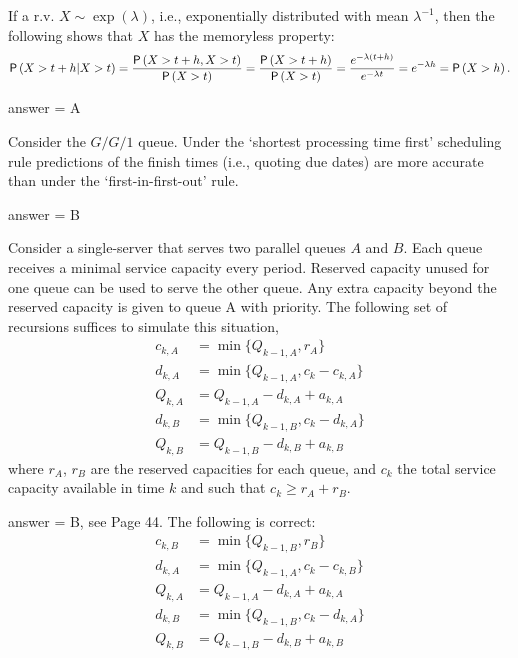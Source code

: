 \begin{exercise}[201802]
If a r.v. $X\sim\exp(\lambda)$, i.e., exponentially distributed with mean $\lambda^{-1}$, then the following shows that $X$ has the memoryless  property:
\begin{equation*}
  \P{X>t+h|X>t} = \frac{\P{X>t+h, X>t}}{\P{X>t}} = \frac{\P{X>t+h}}{\P{X>t}} = \frac{e^{-\lambda(t+h)}}{e^{-\lambda t}} = e^{-\lambda h} = \P{X>h}.
\end{equation*}

\begin{solution}
answer = A
\end{solution}
\end{exercise}

\begin{exercise}[201803]
Consider the $G/G/1$ queue. Under the `shortest processing time first' scheduling rule predictions of the finish times (i.e., quoting due dates) are more accurate than under the `first-in-first-out' rule.
\begin{solution}
answer = B
\end{solution}
\end{exercise}

\begin{exercise}[201803]
 Consider a single-server that  serves two parallel queues $A$ and $B$. Each queue receives a minimal service   capacity every period. Reserved capacity unused for one queue can be
  used to serve the other queue. Any extra capacity beyond the
  reserved capacity is given to queue A with priority. The following set
  of recursions suffices to simulate this situation,
\begin{align*}
  c_{k,A} &= \min\{Q_{ k-1, A}, r_A\}\\
d_{k,A} &= \min\{Q_{k-1, A}, c_k-c_{k,A}\}\\
Q_{k,A} &= Q_{k-1, A} - d_{k,A} + a_{k,A}\\
d_{k,B} &= \min\{Q_{k-1, B}, c_k-d_{k,A}\} \\
Q_{k,B} &= Q_{k-1, B} - d_{k,B} + a_{k,B}
\end{align*}
where $r_A$, $r_B$ are the reserved capacities for each queue, and $c_k$ the total service capacity available in time $k$ and such that $c_k \geq r_A+r_B$.

\begin{solution}
answer = B, see Page 44. The following is correct: 
\begin{align*}
  c_{k,B} &= \min\{Q_{ k-1, B}, r_B\}\\
d_{k,A} &= \min\{Q_{k-1, A}, c_k-c_{k,B}\}\\
Q_{k,A} &= Q_{k-1, A} - d_{k,A} + a_{k,A}\\
d_{k,B} &= \min\{Q_{k-1, B}, c_k-d_{k,A}\}\\
Q_{k,B} &= Q_{k-1, B} - d_{k,B} + a_{k,B}
\end{align*}
\end{solution}
\end{exercise}

